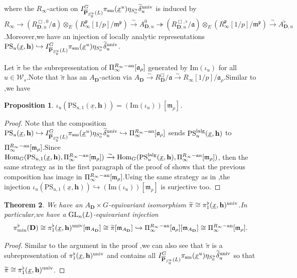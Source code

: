 \documentclass[10pt]{article}
\newtheorem{thm}{Theorem}[section]
\newtheorem{pro}[thm]{Proposition}
\newcommand{\homo}{{\rm Hom}}
\newcommand{\GLN}{{\rm GL}}
\newcommand{\ana}{{\rm an}}
\newcommand{\op}{{\overline{{\mathbf{P}}}}}
\newcommand{\sm}{{\rm sm}}
\newcommand{\lalg}{{\rm lalg}}
\newcommand{\Dpik}{{\mathbf{D}}}
\newcommand{\univ}{{\rm univ}}
\newcommand{\bh}{{\mathbf{h}}}
\newcommand{\fa}{{\mathfrak{a}}}
\newcommand{\fm}{{\mathfrak{m}}}
\newcommand{\fp}{{\mathfrak{p}}}
\newcommand{\sW}{\mathscr W}
\begin{document}
where the $R_{\infty}$-action on $I^G_{\op_{S^u_0}(L)}\pi_{\sm}(\underline{x}^u)\eta_{S^u_0}\widetilde{\delta}_u^{\univ}$ is induced by $R_{\infty}\rightarrow (R^{\Box,0}_{\Dpik,u}/\fa)\otimes_E (R^{\fp}_{\infty}[1/p]/\fm^{\fp})\xrightarrow{\sim}A_{\Dpik,u}^{0}\twoheadrightarrow (R^{\Box,\flat}_{\Dpik,u}/\fa)\otimes_E (R^{\fp}_{\infty}[1/p]/\fm^{\fp})\xrightarrow{\sim}A_{\Dpik,u}^{\flat}$.\;Moreover,\;we have an injection of locally analytic representations $\mathrm{PS}_{u}(\underline{x},\bh)\hookrightarrow I^G_{\op_{S^u_0}(L)}\pi_{\sm}(\underline{x}^u)\eta_{S^u_0}\widetilde{\delta}_u^{\univ}$.\;


Let $\widetilde{\pi}$ be the subrepresentation of $\Pi_\infty^{R_\infty-\ana}[\fa_{\rho}]$ generated by $\mathrm{Im}(\iota_u)$  for all $u\in \sW_s
$.\;Note that $\widetilde{\pi}$ has an $A_{\Dpik}$-action via $A_{\Dpik}\xrightarrow{\sim}R^{\Box}_{\Dpik}/\fa \xrightarrow{\sim}R_{\infty}[1/p]/\fa_{\rho}$.\;Similar to \cite[Lemma 4.4]{ParaDing2024},\;we have
\begin{pro}\label{imiotawmx}
 $\iota_u(\mathrm{PS}_{u,1}(\underline{x},\bh))=(\mathrm{Im}(\iota_u))[\fm_{\rho}]$.\;
 \end{pro}
\begin{proof}
Note that the composition $\mathrm{PS}_{u}(\underline{x},\bh)\hookrightarrow I^G_{\op_{S^u_0}(L)}\pi_{\sm}(\underline{x}^u)\eta_{S^u_0}\widetilde{\delta}_u^{\univ}\hookrightarrow \Pi_\infty^{R_\infty-\ana}[\fa_{\rho}]$ sends $\mathrm{PS}^{\lalg}_{u}(\underline{x},\bh)$ to $\Pi_\infty^{R_\infty-\ana}[\fm_{\rho}]$.\;Since  $\homo_{G}(\mathrm{PS}_{u,1}(\underline{x},\bh),\Pi_\infty^{R_\infty-\ana}[\fm_{\rho}])\xrightarrow{\sim}\homo_{G}(\mathrm{PS}^{\lalg}_{u}(\underline{x},\bh),\Pi_\infty^{R_\infty-\ana}[\fm_{\rho}])$, then the same strategy as in the first paragraph of the proof of \cite[Lemma 4.6]{ParaDing2024} shows that the previous composition has image in $\Pi_\infty^{R_\infty-\ana}[\fm_{\rho}]$.\;Using the same strategy as in \cite[Lemma 4.6]{ParaDing2024},\;the injection $\iota_u(\mathrm{PS}_{u,1}(\underline{x},\bh))\hookrightarrow(\mathrm{Im}(\iota_u))[\fm_{\rho}]$ is surjective too.\;
\end{proof}


\begin{thm}\label{mainthmglobal}We have an $A_{\Dpik}\times G$-equivariant isomorphism $\widetilde{\pi}\cong \pi^{\flat}_{1}(\underline{x},\bh)^{\univ}$.\;In particular,\;we have a $\GLN_n(L)$-equivariant injection
	\[\pi^{\flat}_{\min}(\Dpik)\cong \pi^{\flat}_{1}(\underline{x},\bh)^{\univ}[\fm_{A_{\Dpik}}]\cong \widetilde{\pi}[\fm_{A_{\Dpik}}]\hookrightarrow  \Pi_\infty^{R_\infty-\ana}[\fa_{\rho}][\fm_{A_{\Dpik}}]\cong \Pi_\infty^{R_\infty-\ana}[\fm_{\rho}].\]
\end{thm}
\begin{proof}
	Similar to the argument in the proof \cite[Theorem 4.5,\; Corollary 4.6]{ParaDing2024},\;we can also see that $\widetilde{\pi}$ is a subrepresentation of $\pi^{\flat}_{1}(\underline{x},\bh)^{\univ}$ and contains all $I^G_{\op_{S^u_0}(L)}\pi_{\sm}(\underline{x}^u)\eta_{S^u_0}\widetilde{\delta}_u^{\univ}$ so that $\widetilde{\pi}\cong \pi^{\flat}_{1}(\underline{x},\bh)^{\univ}$.\;
\end{proof}
\end{document}
